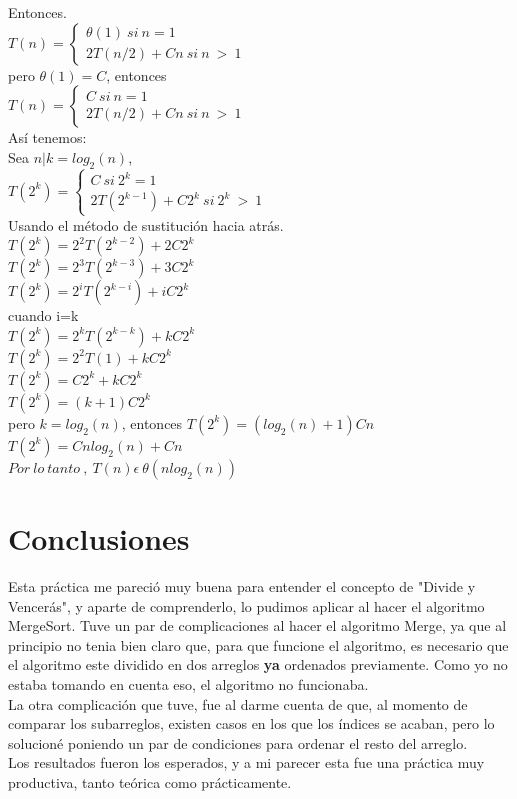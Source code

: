 \documentclass[12pt]{report}
\begin{document}
Entonces.\\
 $T(n) = \left \{ \begin{array}{c} \theta (1) \ si \ n=1 \\ 2T(n/2)+Cn \ si \ n \ > \ 1 \end{array}\right.$\\
 pero $\theta (1)= C$, entonces\\
  $T(n) = \left \{ \begin{array}{c} C \ si \ n=1 \\ 2T(n/2)+Cn \ si \ n \ > \ 1 \end{array}\right.$\\
  Así tenemos: \\
  
  Sea $n | k=log_{2}(n)$, \\
   $T(2^{k}) = \left \{ \begin{array}{c} C \ si \ 2^{k}=1 \\ 2T(2^{k-1})+C2^{k} \ si \ 2^{k} \ > \ 1 \end{array}\right.$\\
Usando el método de sustitución hacia atrás.\\
$T(2^{k})=2^{2}T(2^{k-2})+2C2^{k}$\\
$T(2^{k})=2^{3}T(2^{k-3})+3C2^{k}$\\
$T(2^{k})=2^{i}T(2^{k-i})+iC2^{k}$\\
cuando i=k\\
$T(2^{k})=2^{k}T(2^{k-k})+kC2^{k}$\\
$T(2^{k})=2^{2}T(1)+kC2^{k}$\\
$T(2^{k})=C2^{k}+kC2^{k}$\\
$T(2^{k})=(k+1)C2^{k}$\\
pero $k=log_{2}(n)$, entonces
$T(2^{k})=(log_{2}(n)+1)Cn$\\
$T(2^{k})=Cnlog_{2}(n)+Cn$\\

$Por \ lo \ tanto \ , \ T(n) \epsilon \ \theta (nlog_{2}(n))$


	
\section{Conclusiones}
Esta práctica me pareció muy buena para entender el concepto de "Divide y Vencerás", y aparte de comprenderlo, lo pudimos aplicar al hacer el algoritmo MergeSort. Tuve un par de complicaciones al hacer el algoritmo Merge, ya que al principio no tenia bien claro que, para que funcione el algoritmo, es necesario que el algoritmo este dividido en dos arreglos \textbf{ya} ordenados previamente. Como yo no estaba tomando en cuenta eso, el algoritmo no funcionaba.\\ La otra complicación que tuve, fue al darme cuenta de que, al momento de comparar los subarreglos, existen casos en los que los índices se acaban, pero lo solucioné poniendo un par de condiciones para ordenar el resto del arreglo.\\
Los resultados fueron los esperados, y a mi parecer esta fue una práctica muy productiva, tanto teórica como prácticamente.\newpage 
	
\end{document}
